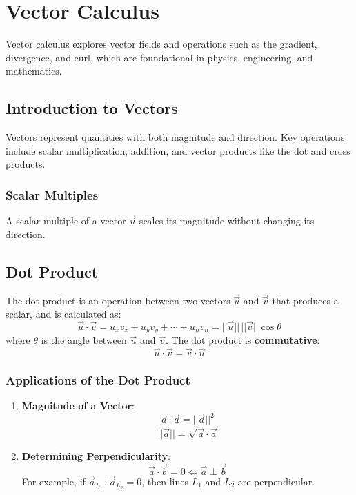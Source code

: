 \documentclass[a4paper,12pt,openany]{book}
\begin{document}
\chapter{Vector Calculus}
Vector calculus explores vector fields and operations such as the gradient, divergence, and curl, which are foundational in physics, engineering, and mathematics.

\section{Introduction to Vectors}
Vectors represent quantities with both magnitude and direction. Key operations include scalar multiplication, addition, and vector products like the dot and cross products.

\subsection{Scalar Multiples}
A scalar multiple of a vector \(\vec{u}\) scales its magnitude without changing its direction.

\section{Dot Product}
The dot product is an operation between two vectors \(\vec{u}\) and \(\vec{v}\) that produces a scalar, and is calculated as:
\[
    \vec{u} \cdot \vec{v} = u_x v_x + u_y v_y + \cdots + u_n v_n = ||\vec{u}|| \, ||\vec{v}|| \cos{\theta}
\]
where \(\theta\) is the angle between \(\vec{u}\) and \(\vec{v}\). The dot product is \textbf{commutative}:
\[
    \vec{u} \cdot \vec{v} = \vec{v} \cdot \vec{u}
\] 

\subsection{Applications of the Dot Product}
\begin{enumerate}
    \item \textbf{Magnitude of a Vector}:
    \[
        \vec{a} \cdot \vec{a} = ||\vec{a}||^2
    \]
    \[
        ||\vec{a}|| = \sqrt{\vec{a} \cdot \vec{a}}
    \]

    \item \textbf{Determining Perpendicularity}:
    \[
        \vec{a} \cdot \vec{b} = 0 \iff \vec{a} \perp \vec{b}
    \]
    For example, if \(\vec{a}_{L_1} \cdot \vec{a}_{L_2} = 0\), then lines \(L_1\) and \(L_2\) are perpendicular.
\end{enumerate}
\end{document}
